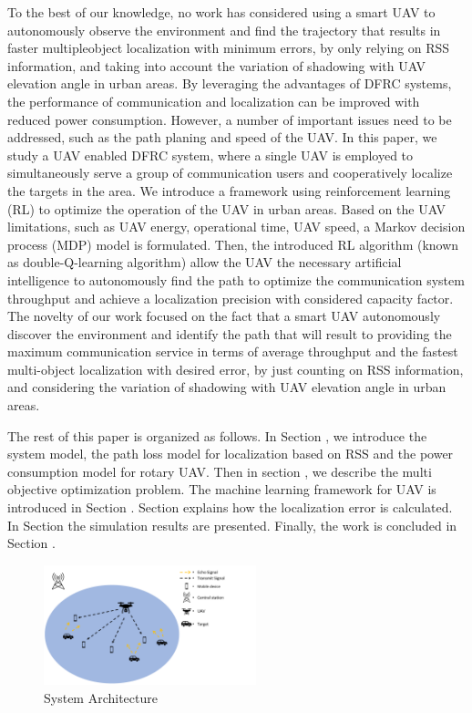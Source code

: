 \documentclass[journal,twocolumn]{IEEEtran}
\begin{document}
To the best of our knowledge, no work has considered using a smart UAV to autonomously observe the environment and find the trajectory that results in faster multipleobject localization with minimum errors, by only relying on RSS information, and taking into account the variation of shadowing with UAV elevation angle in urban areas. By leveraging the advantages of DFRC systems, the performance of communication and localization can be improved with reduced power consumption. However, a number of important issues need to be addressed, such as the path planing and speed of the UAV. In this paper, we study a UAV enabled DFRC system, where a single UAV is employed to simultaneously serve a group of communication users and cooperatively localize the targets in the area. We introduce a framework using reinforcement learning (RL) to optimize the operation of the UAV in urban areas. Based on the UAV limitations, such as UAV energy, operational time, UAV speed, a Markov decision process (MDP) model is formulated. Then, the introduced RL algorithm (known as double-Q-learning algorithm) allow the UAV the necessary artificial intelligence to autonomously find the path to optimize the communication system throughput and achieve a localization precision with considered capacity factor. The novelty of our work focused on the fact that a smart UAV autonomously discover the environment and identify the path that will result to providing the maximum communication service in terms of average throughput and the fastest multi-object localization with desired error, by just counting on RSS information, and considering the variation of shadowing with UAV elevation angle in urban areas.

The rest of this paper is organized as follows. In Section , we introduce the system model, the path loss model for localization based on RSS and the power consumption model for rotary UAV. Then in section , we describe the multi objective optimization problem. The machine learning framework for UAV is introduced in Section . Section  explains how the localization error is calculated. In Section  the simulation results are presented. Finally, the work is concluded in Section .




\begin{figure}[t!]
\vspace{-10pt}
  \centering
  \includegraphics[width=0.55\textwidth]{Figures/fig1}
    \vspace*{-1mm}
  \caption{System Architecture}\label{fig.fig_1}
\end{figure}
\end{document}
